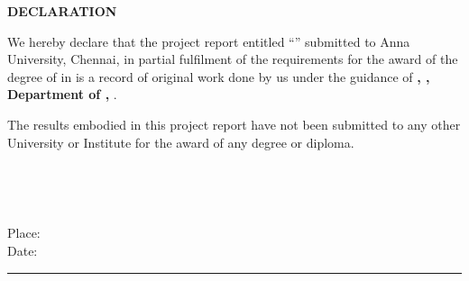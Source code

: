 %
%

\clearpage
\thispagestyle{plain}

\begin{center}
  \vspace*{0.5cm}
  {\SubTitleSize\bfseries DECLARATION\par}
\end{center}

\vspace{1cm}

\noindent
We hereby declare that the project report entitled
``\textbf{\ProjectTitle}'' submitted to Anna University, Chennai,
in partial fulfilment of the requirements for the award of the degree of
\textbf{\DegreeName} in \textbf{\BranchName} is a record of original
work done by us under the guidance of
\textbf{\GuideName, \GuideDesignation, Department of \DepartmentName,
\CollegeName}.

\vspace{0.5cm}

\noindent
The results embodied in this project report have not been submitted to any
other University or Institute for the award of any degree or diploma.

\vspace{2cm}

\noindent
\begin{minipage}[t]{0.45\textwidth}
  \textbf{\StudentOneName}\\
  \StudentOneRegNo
\end{minipage}%
\hfill
\begin{minipage}[t]{0.45\textwidth}
  \textbf{\StudentTwoName}\\
  \StudentTwoRegNo
\end{minipage}

\vspace{2cm}

\noindent
Place: \CollegeLocation\\
Date: \rule{3cm}{0.4pt}
